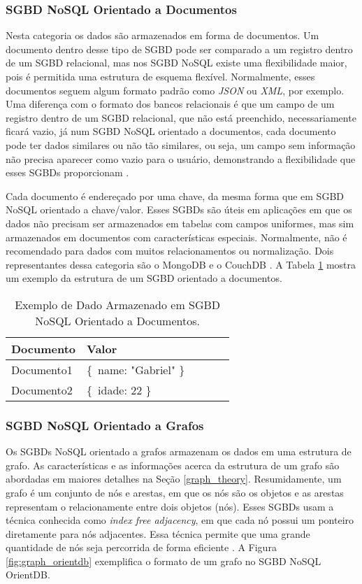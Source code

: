 \subsubsection{SGBD NoSQL Orientado a Documentos}
	Nesta categoria os dados são armazenados em forma de documentos. Um documento dentro desse tipo de SGBD pode ser comparado a um registro dentro de um SGBD relacional, mas nos SGBD NoSQL existe uma flexibilidade maior, pois é permitida uma estrutura de esquema flexível. Normalmente, esses documentos seguem algum formato padrão como \textit{JSON} ou \textit{XML}, por exemplo. Uma diferença com o formato dos bancos relacionais é que um campo de um registro dentro de um SGBD relacional, que não está preenchido, necessariamente ficará vazio, já num SGBD NoSQL orientado a documentos, cada documento pode ter dados similares ou não tão similares, ou seja, um campo sem informação não precisa aparecer como vazio para o usuário, demonstrando a flexibilidade que esses SGBDs proporcionam \cite{nayak2013type}.
	
	Cada documento é endereçado por uma chave, da mesma forma que em SGBD NoSQL orientado a chave/valor. Esses SGBDs são úteis em aplicações em que os dados não precisam ser armazenados em tabelas com campos uniformes, mas sim armazenados em documentos com características especiais. Normalmente, não é recomendado para dados com muitos relacionamentos ou normalização. Dois representantes dessa categoria são o MongoDB e o CouchDB \cite{nayak2013type}. A Tabela \ref{table:documents} mostra um exemplo da estrutura de um SGBD orientado a documentos.
	
\begin{table}[h!]
\centering
\caption{Exemplo de Dado Armazenado em SGBD NoSQL Orientado a Documentos.}
\begin{tabular}{|l|l|l|l|l|}
\hline
Documento & Valor \\ \hline
Documento1 & \{\ name: "Gabriel" \}\ \\ \hline
Documento2 & \{\ idade: 22 \}\ \\ \hline
\end{tabular}
\label{table:documents}
\end{table}
	
\subsubsection{SGBD NoSQL Orientado a Grafos}
	Os SGBDs NoSQL orientado a grafos armazenam os dados em uma estrutura de grafo. As características e as informações acerca da estrutura de um grafo são abordadas em maiores detalhes na Seção \ref{graph_theory}. Resumidamente, um grafo é um conjunto de nós e arestas, em que os nós são os objetos e as arestas representam o relacionamente entre dois objetos (nós). Esses SGBDs usam a técnica conhecida como  \textit{index free adjacency}, em que cada nó possui um ponteiro diretamente para nós adjacentes. Essa técnica permite que uma grande quantidade de nós seja percorrida de forma eficiente \cite{nayak2013type}. A Figura \ref{fig:graph_orientdb} exemplifica o formato de um grafo no SGBD NoSQL OrientDB.


